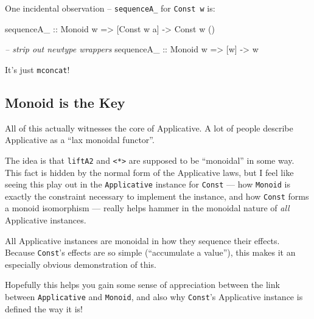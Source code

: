 \documentclass[]{article}
\newenvironment{Shaded}{}{}
\newcommand{\CommentTok}[1]{\textcolor[rgb]{0.38,0.63,0.69}{\textit{#1}}}
\newcommand{\DataTypeTok}[1]{\textcolor[rgb]{0.56,0.13,0.00}{#1}}
\newcommand{\NormalTok}[1]{#1}
\newcommand{\OtherTok}[1]{\textcolor[rgb]{0.00,0.44,0.13}{#1}}
\begin{document}
One incidental observation -- \texttt{sequenceA\_} for \texttt{Const\ w} is:

\begin{Shaded}
\begin{Highlighting}[]
\OtherTok{sequenceA_ ::} \DataTypeTok{Monoid}\NormalTok{ w }\OtherTok{=>}\NormalTok{ [}\DataTypeTok{Const}\NormalTok{ w a] }\OtherTok{->} \DataTypeTok{Const}\NormalTok{ w ()}

\CommentTok{-- strip out newtype wrappers}
\OtherTok{sequenceA_ ::} \DataTypeTok{Monoid}\NormalTok{ w }\OtherTok{=>}\NormalTok{ [w] }\OtherTok{->}\NormalTok{ w}
\end{Highlighting}
\end{Shaded}

It's just \texttt{mconcat}!

\hypertarget{monoid-is-the-key}{%
\subsection{Monoid is the Key}\label{monoid-is-the-key}}

All of this actually witnesses the core of Applicative. A lot of people describe
Applicative as a ``lax monoidal functor''.

The idea is that \texttt{liftA2} and \texttt{\textless{}*\textgreater{}} are
supposed to be ``monoidal'' in some way. This fact is hidden by the normal form
of the Applicative laws, but I feel like seeing this play out in the
\texttt{Applicative} instance for \texttt{Const} --- how \texttt{Monoid} is
exactly the constraint necessary to implement the instance, and how
\texttt{Const} forms a monoid isomorphism --- really helps hammer in the
monoidal nature of \emph{all} Applicative instances.

All Applicative instances are monoidal in how they sequence their effects.
Because \texttt{Const}'s effects are so simple (``accumulate a value''), this
makes it an especially obvious demonstration of this.

Hopefully this helps you gain some sense of appreciation between the link
between \texttt{Applicative} and \texttt{Monoid}, and also why \texttt{Const}'s
Applicative instance is defined the way it is!
\end{document}
